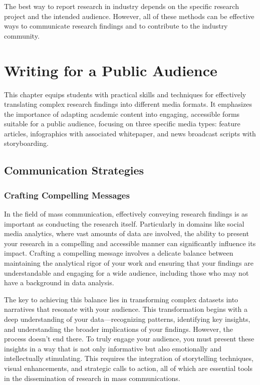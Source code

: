 \documentclass[
]{book}
\begin{document}
The best way to report research in industry depends on the specific research project and the intended audience. However, all of these methods can be effective ways to communicate research findings and to contribute to the industry community.

\chapter{Writing for a Public Audience}\label{writing-for-a-public-audience}

This chapter equips students with practical skills and techniques for effectively translating complex research findings into different media formats. It emphasizes the importance of adapting academic content into engaging, accessible forms suitable for a public audience, focusing on three specific media types: feature articles, infographics with associated whitepaper, and news broadcast scripts with storyboarding.

\section{Communication Strategies}\label{communication-strategies}

\subsection*{Crafting Compelling Messages}\label{crafting-compelling-messages}

In the field of mass communication, effectively conveying research findings is as important as conducting the research itself. Particularly in domains like social media analytics, where vast amounts of data are involved, the ability to present your research in a compelling and accessible manner can significantly influence its impact. Crafting a compelling message involves a delicate balance between maintaining the analytical rigor of your work and ensuring that your findings are understandable and engaging for a wide audience, including those who may not have a background in data analysis.

The key to achieving this balance lies in transforming complex datasets into narratives that resonate with your audience. This transformation begins with a deep understanding of your data---recognizing patterns, identifying key insights, and understanding the broader implications of your findings. However, the process doesn't end there. To truly engage your audience, you must present these insights in a way that is not only informative but also emotionally and intellectually stimulating. This requires the integration of storytelling techniques, visual enhancements, and strategic calls to action, all of which are essential tools in the dissemination of research in mass communications.
\end{document}
